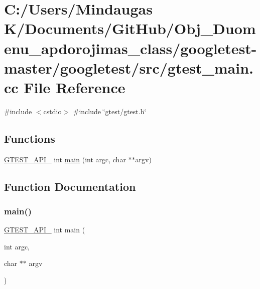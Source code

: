 \hypertarget{googletest-master_2googletest_2src_2gtest__main_8cc}{}\section{C\+:/\+Users/\+Mindaugas K/\+Documents/\+Git\+Hub/\+Obj\+\_\+\+Duomenu\+\_\+apdorojimas\+\_\+class/googletest-\/master/googletest/src/gtest\+\_\+main.cc File Reference}
\label{googletest-master_2googletest_2src_2gtest__main_8cc}
{\ttfamily \#include $<$cstdio$>$}\newline
{\ttfamily \#include \char`\"{}gtest/gtest.\+h\char`\"{}}\newline
\subsection*{Functions}
\begin{DoxyCompactItemize}
\item 
\mbox{\hyperlink{_obj__test_2lib_2googletest-release-1_88_81_2googletest_2include_2gtest_2internal_2gtest-port_8h_aa73be6f0ba4a7456180a94904ce17790}{G\+T\+E\+S\+T\+\_\+\+A\+P\+I\+\_\+}} int \mbox{\hyperlink{googletest-master_2googletest_2src_2gtest__main_8cc_a7f83bdc516d2cb86e20235d94ddf055a}{main}} (int argc, char $\ast$$\ast$argv)
\end{DoxyCompactItemize}


\subsection{Function Documentation}
\mbox{\label{googletest-master_2googletest_2src_2gtest__main_8cc_a7f83bdc516d2cb86e20235d94ddf055a}} 
\subsubsection{\texorpdfstring{main()}{main()}}
{\footnotesize\ttfamily \mbox{\hyperlink{_obj__test_2lib_2googletest-release-1_88_81_2googletest_2include_2gtest_2internal_2gtest-port_8h_aa73be6f0ba4a7456180a94904ce17790}{G\+T\+E\+S\+T\+\_\+\+A\+P\+I\+\_\+}} int main (\begin{DoxyParamCaption}\item[{int}]{argc,  }\item[{char $\ast$$\ast$}]{argv }\end{DoxyParamCaption})}

